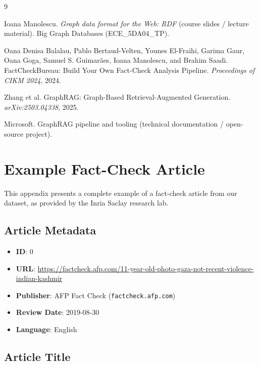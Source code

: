 \documentclass[10pt]{article}
\begin{document}
\begin{thebibliography}{9}

Ioana Manolescu.
\newblock \emph{Graph data format for the Web: RDF} (course slides / lecture material).
\newblock Big Graph Databases (ECE\_5DA04\_TP).

Oana Denisa Balalau, Pablo Bertaud-Velten, Younes El-Fraihi, Garima Gaur, Oana Goga, Samuel S. Guimar{\~a}es, Ioana Manolescu, and Brahim Saadi.
\newblock FactCheckBureau: Build Your Own Fact-Check Analysis Pipeline.
\newblock \emph{Proceedings of CIKM 2024}, 2024.

Zhang et al.
\newblock GraphRAG: Graph-Based Retrieval-Augmented Generation.
\newblock \emph{arXiv:2503.04338}, 2025.

Microsoft.
\newblock GraphRAG pipeline and tooling (technical documentation / open-source project).

\end{thebibliography}

\newpage
\onecolumn
\appendix

\section{Example Fact-Check Article}
\label{app:example}

This appendix presents a complete example of a fact-check article from our dataset, as provided by the Inria Saclay research lab.

\subsection{Article Metadata}

\begin{itemize}[itemsep=3pt]
    \item \textbf{ID}: 0
    \item \textbf{URL}: \url{https://factcheck.afp.com/11-year-old-photo-gaza-not-recent-violence-indian-kashmir}
    \item \textbf{Publisher}: AFP Fact Check (\texttt{factcheck.afp.com})
    \item \textbf{Review Date}: 2019-08-30
    \item \textbf{Language}: English
\end{itemize}

\subsection{Article Title}
\end{document}
